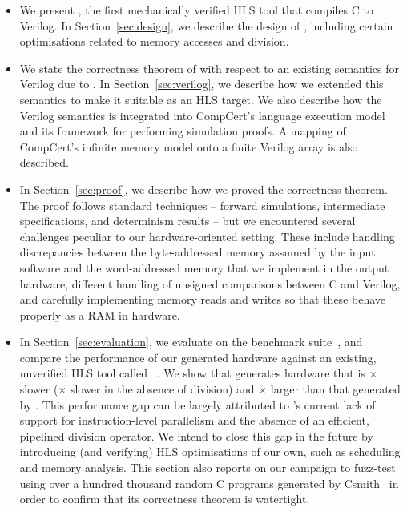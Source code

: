 \begin{itemize}
  \item We present \vericert{}, the first mechanically verified HLS tool that compiles C to Verilog. In Section~\ref{sec:design}, we describe the design of \vericert{}, including certain optimisations related to memory accesses and division.
  \item We state the correctness theorem of \vericert{} with respect to an existing semantics for Verilog due to \textcite{loow19_proof_trans_veril_devel_hol}. In Section~\ref{sec:verilog}, we describe how we extended this semantics to make it suitable as an HLS target.  We also describe how the Verilog semantics is integrated into CompCert's language execution model and its framework for performing simulation proofs. A mapping of CompCert's infinite memory model onto a finite Verilog array is also described.
  \item In Section~\ref{sec:proof}, we describe how we proved the correctness theorem. The proof follows standard \compcert{} techniques -- forward simulations, intermediate specifications, and determinism results -- but we encountered several challenges peculiar to our hardware-oriented setting. %
  These include handling discrepancies between the byte-addressed memory assumed by the input software and the word-addressed memory that we implement in the output hardware,  different handling of unsigned comparisons between C and Verilog, and carefully implementing memory reads and writes so that these behave properly as a RAM in hardware.
  \item In Section~\ref{sec:evaluation}, we evaluate \vericert{} on the \polybench{} benchmark suite~\cite{polybench}, and compare the performance of our generated hardware against an existing, unverified HLS tool called \legup{}~\cite{canis11_legup}. We show that \vericert{} generates hardware that is \slowdownOrig$\times$ slower (\slowdownDiv$\times$ slower in the absence of division) and \areaIncr$\times$ larger than that generated by \legup{}. This performance gap can be largely attributed to \vericert{}'s current lack of support for instruction-level parallelism and the absence of an efficient, pipelined division operator. We intend to close this gap in the future by introducing (and verifying) HLS optimisations of our own, such as scheduling and memory analysis.  This section also reports on our campaign to fuzz-test \vericert{} using over a hundred thousand random C programs generated by Csmith~\cite{yang11_findin_under_bugs_c_compil} in order to confirm that its correctness theorem is watertight. %
\end{itemize}
